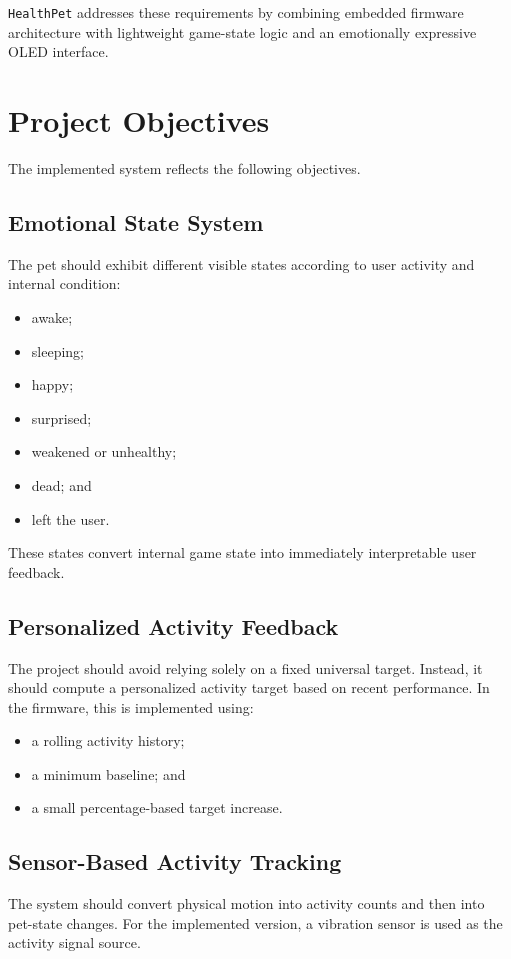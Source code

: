 \documentclass[conference]{IEEEtran}
\begin{document}
\texttt{HealthPet} addresses these requirements by combining embedded firmware architecture with lightweight game-state logic and an emotionally expressive OLED interface.

\section{Project Objectives}
The implemented system reflects the following objectives.

\subsection{Emotional State System}
The pet should exhibit different visible states according to user activity and internal condition:
\begin{itemize}
\item awake;
\item sleeping;
\item happy;
\item surprised;
\item weakened or unhealthy;
\item dead; and
\item left the user.
\end{itemize}
These states convert internal game state into immediately interpretable user feedback.

\subsection{Personalized Activity Feedback}
The project should avoid relying solely on a fixed universal target. Instead, it should compute a personalized activity target based on recent performance. In the firmware, this is implemented using:
\begin{itemize}
\item a rolling activity history;
\item a minimum baseline; and
\item a small percentage-based target increase.
\end{itemize}

\subsection{Sensor-Based Activity Tracking}
The system should convert physical motion into activity counts and then into pet-state changes. For the implemented version, a vibration sensor is used as the activity signal source.
\end{document}
